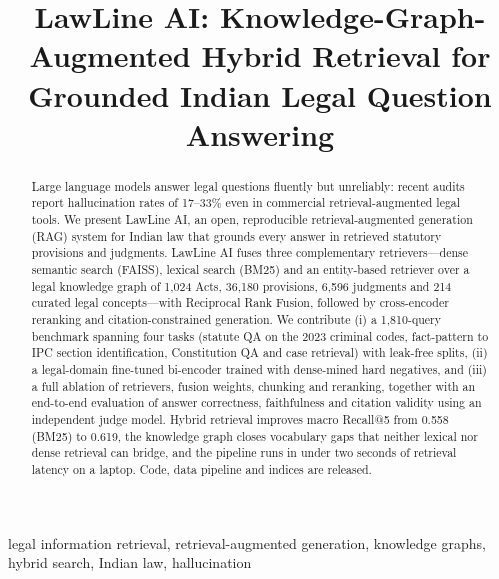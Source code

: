 \documentclass[conference]{IEEEtran}
\newcommand{\sys}{LawLine AI}
\begin{document}
\title{\sys: Knowledge-Graph-Augmented Hybrid Retrieval for Grounded Indian Legal Question Answering}

\author{
}
\maketitle

\begin{abstract}
Large language models answer legal questions fluently but unreliably: recent audits report hallucination rates of 17--33\% even in commercial retrieval-augmented legal tools. We present \sys, an open, reproducible retrieval-augmented generation (RAG) system for Indian law that grounds every answer in retrieved statutory provisions and judgments. \sys{} fuses three complementary retrievers---dense semantic search (FAISS), lexical search (BM25) and an entity-based retriever over a legal knowledge graph of 1,024 Acts, 36,180 provisions, 6,596 judgments and 214 curated legal concepts---with Reciprocal Rank Fusion, followed by cross-encoder reranking and citation-constrained generation. We contribute (i) a 1,810-query benchmark spanning four tasks (statute QA on the 2023 criminal codes, fact-pattern to IPC section identification, Constitution QA and case retrieval) with leak-free splits, (ii) a legal-domain fine-tuned bi-encoder trained with dense-mined hard negatives, and (iii) a full ablation of retrievers, fusion weights, chunking and reranking, together with an end-to-end evaluation of answer correctness, faithfulness and citation validity using an independent judge model. Hybrid retrieval improves macro Recall@5 from 0.558 (BM25) to 0.619, the knowledge graph closes vocabulary gaps that neither lexical nor dense retrieval can bridge, and the pipeline runs in under two seconds of retrieval latency on a laptop. Code, data pipeline and indices are released.
\end{abstract}

\begin{IEEEkeywords}
legal information retrieval, retrieval-augmented generation, knowledge graphs, hybrid search, Indian law, hallucination
\end{IEEEkeywords}
\end{document}

